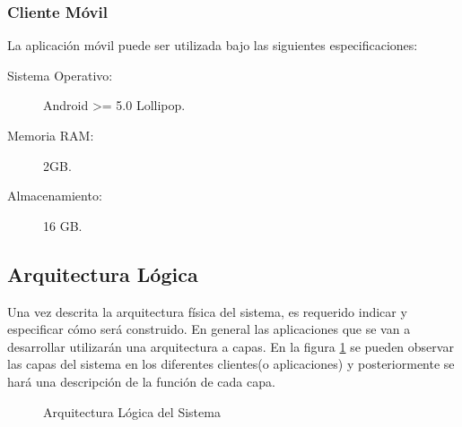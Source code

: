 \subsubsection{Cliente Móvil}
La aplicación móvil puede ser utilizada bajo las siguientes especificaciones:
	\begin{description}
		\item[Sistema Operativo:] Android >= 5.0 Lollipop.
		\item[Memoria RAM:] 2GB.
		\item[Almacenamiento:] 16 GB.
	\end{description}


\subsection{Arquitectura Lógica}
Una vez descrita la arquitectura física del sistema, es requerido indicar y especificar cómo será construido. En general las aplicaciones que se van a desarrollar utilizarán una arquitectura a capas. En la figura \ref{fig:arqLogica} se pueden observar las capas del sistema en los diferentes clientes(o aplicaciones) y posteriormente se hará una descripción de la función de cada capa.\\

\begin{figure}[hbtp!]
	\begin{center}
		\caption{Arquitectura Lógica del Sistema}
		\label{fig:arqLogica}
	\end{center}
\end{figure}

